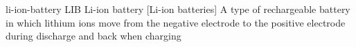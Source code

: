 \newglsXacronym%
{li-ion-battery}%
{LIB}%
{Li-ion battery}%
[Li-ion batteries]%
{A type of rechargeable battery in which lithium ions move from the negative electrode to the positive electrode during discharge and back when charging}%